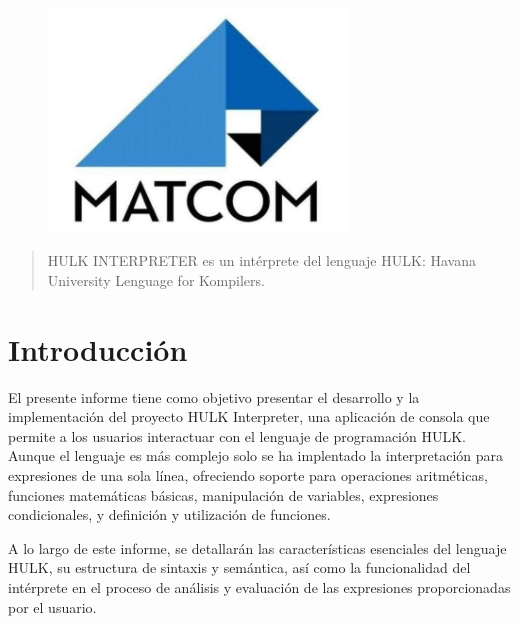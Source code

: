 \documentclass[a4paper, 12pt]{article}
\begin{document}
\begin{center}
\\
\vspace {2cm}
\\
\vspace {1cm}
\\
\vspace {0.5cm}
\\
\vspace {10cm}
\begin{figure}[h]
       \center
       \includegraphics[width=8cm]{matcom.jpg}
\end{figure}
\end{center}

\newpage
\begin{abstract}
HULK INTERPRETER es un intérprete del lenguaje HULK: Havana University Lenguage for Kompilers.
\end{abstract}
\tableofcontents
\newpage

\section{Introducción}\label{sec;intro}
El presente informe tiene como objetivo presentar el desarrollo y la implementación del proyecto HULK Interpreter, una aplicación de consola que permite a los usuarios interactuar con el lenguaje de programación HULK. Aunque el lenguaje es más complejo solo se ha implentado la interpretación  para expresiones de una sola línea, ofreciendo soporte para operaciones aritméticas, funciones matemáticas básicas, manipulación de variables, expresiones condicionales, y definición y utilización de funciones.

A lo largo de este informe, se detallarán las características esenciales del lenguaje HULK, su estructura de sintaxis y semántica, así como la funcionalidad del intérprete en el proceso de análisis y evaluación de las expresiones proporcionadas por el usuario.
\end{document}
